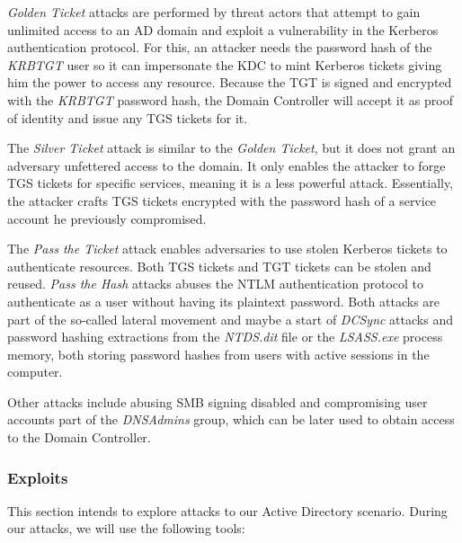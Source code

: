 \textit{Golden Ticket} attacks are performed by threat actors that attempt to gain unlimited access to an AD domain and exploit a vulnerability in the Kerberos authentication protocol. For this, an attacker needs the password hash of the \textit{KRBTGT} user so it can impersonate the KDC to mint Kerberos tickets giving him the power to access any resource. Because the TGT is signed and encrypted with the \textit{KRBTGT} password hash, the Domain Controller will accept it as proof of identity and issue any TGS tickets for it.


The \textit{Silver Ticket} attack is similar to the \textit{Golden Ticket}, but it does not grant an adversary unfettered access to the domain. It only enables the attacker to forge TGS tickets for specific services, meaning it is a less powerful attack. Essentially, the attacker crafts TGS tickets encrypted with the password hash of a service account he previously compromised.

The \textit{Pass the Ticket} attack enables adversaries to use stolen Kerberos tickets to authenticate resources. Both TGS tickets and TGT tickets can be stolen and reused. \textit{Pass the Hash} attacks abuses the NTLM authentication protocol to authenticate as a user without having its plaintext password. Both attacks are part of the so-called lateral movement and maybe a start of \textit{DCSync} attacks and password hashing extractions from the \textit{NTDS.dit} file or the \textit{LSASS.exe} process memory, both storing password hashes from users with active sessions in the computer.

Other attacks include abusing SMB signing disabled and compromising user accounts part of the \textit{DNSAdmins} group, which can be later used to obtain access to the Domain Controller.


\subsubsection{Exploits} \label{sec:validation_ad_exploit}

This section intends to explore attacks to our Active Directory scenario. During our attacks, we will use the following tools:


